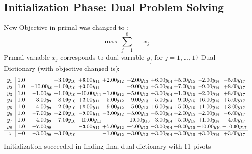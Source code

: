 \documentclass[9pt]{article}
\begin{document}
\subsection{Initialization Phase: Dual Problem Solving}
New Objective in primal was changed to : \[ \max\ \sum_{j=1}^{8}\ - x_j \] 
Primal variable $x_j$ corresponds to dual variable $y_j$ for $j = 1,\ldots,17$
Dual Dictionary (with objective changed is): 
\[\begin{array}{c| c c@{\hskip 2pt} c@{\hskip 2pt} c@{\hskip 2pt} c@{\hskip 2pt} c@{\hskip 2pt} c@{\hskip 2pt} c@{\hskip 2pt} c@{\hskip 2pt} c@{\hskip 2pt} }
 y_{1}   &  1.0  &   & -3.00 y_{10} & +  6.00 y_{11} & +  2.00 y_{12} & +  2.00 y_{13} & +  6.00 y_{14} & +  5.00 y_{15} & -2.00 y_{16} & -5.00 y_{17}\\
 y_{2}   &  1.0 & -10.00 y_{9} & -1.00 y_{10} & +  3.00 y_{11} &   & +  9.00 y_{13} & +  5.00 y_{14} & +  7.00 y_{15} & -9.00 y_{16} & +  8.00 y_{17}\\
 y_{3}   &  1.0 & -1.00 y_{9} & +  1.00 y_{10} & + 10.00 y_{11} & -1.00 y_{12} & -5.00 y_{13} & +  3.00 y_{14} & +  1.00 y_{15} & -2.00 y_{16} & +  8.00 y_{17}\\
 y_{4}   &  1.0 & +  3.00 y_{9} & +  8.00 y_{10} & +  2.00 y_{11} & -5.00 y_{12} & +  9.00 y_{13} & -5.00 y_{14} & -9.00 y_{15} & +  6.00 y_{16} & +  5.00 y_{17}\\
 y_{5}   &  1.0 & +  4.00 y_{9} & -2.00 y_{10} & +  8.00 y_{11} & -9.00 y_{12} & -5.00 y_{13} & +  6.00 y_{14} & +  5.00 y_{15} & +  1.00 y_{16} & +  3.00 y_{17}\\
 y_{6}   &  1.0 & -7.00 y_{9} & -2.00 y_{10} & -9.00 y_{11} & -3.00 y_{12} & -3.00 y_{13} & -5.00 y_{14} & +  2.00 y_{15} & -2.00 y_{16} & -6.00 y_{17}\\
 y_{7}   &  1.0 & -4.00 y_{9} & +  7.00 y_{10} & -10.00 y_{11} &   & -10.00 y_{13} & -3.00 y_{14} & +  5.00 y_{15} & +  1.00 y_{16} & -4.00 y_{17}\\
 y_{8}   &  1.0 & +  7.00 y_{9} &   & -3.00 y_{11} & +  5.00 y_{12} & +  4.00 y_{13} & -3.00 y_{14} & +  8.00 y_{15} & -10.00 y_{16} & -10.00 y_{17}\\
\hline
z    &  -0 & -3.00 y_{9} & -3.00 y_{10} &   & -1.00 y_{12} & -3.00 y_{13} & +  3.00 y_{14} & +  3.00 y_{15} & +  3.00 y_{16} & +  3.00 y_{17}\\
\end{array}\]
Initialization succeeded in finding final dual dictionary with 11 pivots
\end{document}
